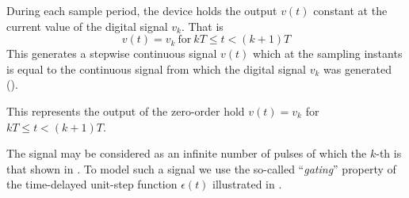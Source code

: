 During each sample period, the device holds the output $v(t)$ constant
at the current value of the digital signal $v_k$. That is
\begin{equation}
  \label{eq:l11e4}
  v(t) = v_k\ \mathrm{for}\ kT \le t < (k+1)T
\end{equation}
This generates a stepwise continuous signal $v(t)$ which at the
sampling instants is equal to the continuous signal from which the
digital signal ${v_k}$ was generated ().

\begin{slide}\label{slide:l11s3}
  This represents the output of the zero-order hold $v(t) = v_k$ for
  $kT \le t < (k+1)T$.\\
  \begin{center}
  \end{center}
\end{slide}

The signal may be considered as an infinite number of pulses of which
  the $k$-th is that shown in . To model such a
  signal we use the so-called ``\emph{gating}'' property of the
  time-delayed unit-step function $\epsilon(t)$ illustrated in .

\begin{slide}\label{slide:l11s4}

  \begin{center}
  \end{center}
\end{slide}

\begin{slide}\label{slide:l11s5}
  \begin{center}
  \end{center}
\end{slide}

